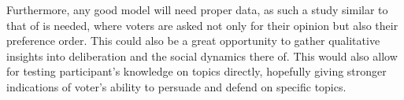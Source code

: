 Furthermore, any good model will need proper data, as such a study similar to
that of \citet{fishkinCanDeliberationHave2024} is needed, where voters are
asked not only for their opinion but also their preference order. This could
also be a great opportunity to gather qualitative insights into deliberation
and the social dynamics there of. This would also allow for testing participant's 
knowledge on topics directly, hopefully giving stronger indications of voter's ability 
to persuade and defend on specific topics.


